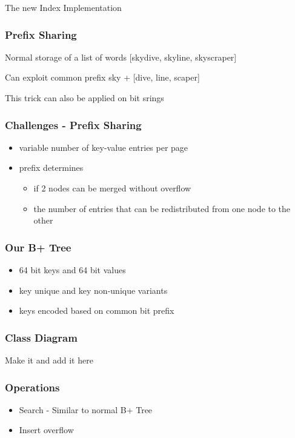\documentclass{beamer}
\begin{document}
\begin{section}{The new Index Implementation}
    \begin{frame}
      \frametitle{Prefix Sharing}
      \begin{block} {Normal storage of a list of words}
      [skydive, skyline, skyscraper] 
      \end{block}
      \begin{block} {Can exploit common prefix}
      sky + [dive, line, scaper]
      \end{block}
      This trick can also be applied on bit srings
    \end{frame}
    \begin{frame}
        \frametitle{Challenges - Prefix Sharing}
        \begin{itemize}
            \item variable number of key-value entries per page
            \item prefix determines
            \begin{itemize}
                \item if 2 nodes can be merged without overflow
                \item the number of entries that can be redistributed from one node to the other
            \end{itemize}
        \end{itemize}    
    \end{frame}
    \begin{frame}
      \frametitle{Our B+ Tree}
      \begin{itemize}
        \item 64 bit keys and 64 bit values
        \item key unique and key non-unique variants
        \item keys encoded based on common bit prefix
      \end{itemize}
    \end{frame}
    \begin{frame}
        \frametitle{Class Diagram}
        Make it and add it here    
    \end{frame}
    \begin{frame}
        \frametitle{Operations}
        \begin{itemize}
        \item Search - Similar to normal B+ Tree
        \item Insert overflow

\end{itemize}
\end{frame}
\end{section}
\end{document}
